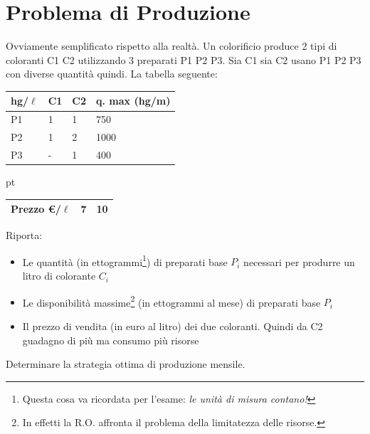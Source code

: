 \documentclass{article}
\begin{document}
\section{Problema di Produzione} 
Ovviamente semplificato rispetto alla realtà. Un colorificio produce 2 tipi di coloranti C1 C2 utilizzando 3 preparati P1 P2 P3. Sia C1 sia C2 usano P1 P2 P3 con diverse quantità quindi. La tabella seguente:
\begin{table}[h!]
    \centering
    \begin{tabular}{|m{5em}|m{2em}|m{2em}|m{6.5em}|}
    \hline
    hg/$\ell$ & C1 & C2 & q. max (hg/m)\\
    \hline
    P1 & 1 & 1 & 750\\
    \hline
    P2 & 1 & 2 & 1000\\
    \hline
    P3 & - & 1 & 400\\
    \hline
    \end{tabular}
     pt
    \raggedright
    \hspace{2.345cm}
    \begin{tabular}{|m{5em}|m{2em}|m{2em}|}
    \hline
    Prezzo \euro/$\ell$ & 7 & 10\\
    \hline
    \end{tabular}
\end{table}
Riporta:
\begin{itemize}
    \item Le quantità (in ettogrammi\footnote{Questa cosa va ricordata per l'esame: \textit{le unità di misura contano!}}) di preparati base $P_i$ necessari per produrre un litro di colorante $C_i$
    \item Le disponibilità massime\footnote{In effetti la R.O. affronta il problema della limitatezza delle risorse.} (in ettogrammi al mese) di preparati base $P_i$
    \item Il prezzo di vendita (in euro al litro) dei due coloranti. Quindi da C2 guadagno di più ma consumo più risorse
\end{itemize}
Determinare la strategia ottima di produzione mensile.
\end{document}
